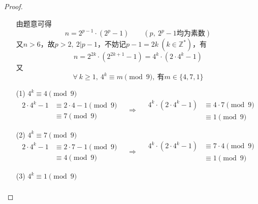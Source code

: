 \documentclass[UTF8]{ctexart}
\begin{document}
\subsection{}   %
\begin{proof}
    \begin{enumerate}
        \item []
        \item []由题意可得
        \[
            n =2^{p-1}\cdot (2^p - 1)    
            \qquad
            (p,\ 2^{p}-1 \mbox{均为素数})
        \]
        又$n>6$，故$p>2,\ 2|p-1$，不妨记$p-1=2k\ (k\in \mathbb{Z}^{*})$，有
        \[
            n = 2^{2k} \cdot (2^{2k+1} - 1)
            = 4^{k} \cdot (2\cdot 4^{k} -1)    
        \]
        又
        \[
            \forall\ k\geq 1,\ 
            4^{k} \equiv m \pmod{9},\ 
            \mbox{有}
            m\in\{4,7, 1\}
        \]
        \item [(1)]$4^{k} \equiv 4 \pmod{9}$
        \[
            \begin{aligned}
                2\cdot 4^{k} - 1
                & \equiv 
                2\cdot 4 -1 \pmod{9}\\
                & \equiv
                7 \pmod{9}
            \end{aligned}
            \quad \Rightarrow \quad
            \begin{aligned}
                4^{k}\cdot (2\cdot 4^{k} -1)
                & \equiv
                4\cdot 7 \pmod{9}\\
                & \equiv
                1 \pmod{9}
            \end{aligned}  
        \]
        \item [(2)]$4^{k} \equiv 7 \pmod{9}$
        \[
            \begin{aligned}
                2\cdot 4^{k} - 1
                & \equiv 
                2\cdot 7 -1 \pmod{9}\\
                & \equiv
                4 \pmod{9}
            \end{aligned}
            \quad \Rightarrow \quad
            \begin{aligned}
                4^{k}\cdot (2\cdot 4^{k} -1)
                & \equiv
                7\cdot 4 \pmod{9}\\
                & \equiv
                1 \pmod{9}
            \end{aligned}  
        \]
        \item [(3)]$4^{k} \equiv 1 \pmod{9}$
        \[
            \begin{aligned}

\end{aligned}\]
\end{enumerate}
\end{proof}
\end{document}
